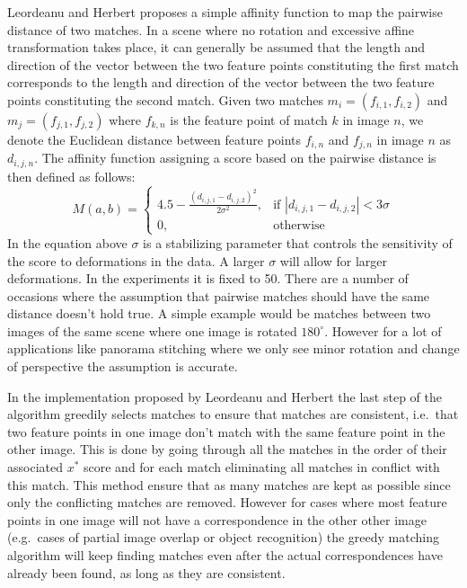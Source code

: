 Leordeanu and Herbert proposes a simple affinity function to map the 
pairwise distance of two matches. In a scene where no rotation and 
excessive affine transformation takes place, it can generally be assumed 
that the length and direction of the vector between
the two feature points constituting the first match corresponds to the 
length and direction of the vector between the two feature points 
constituting the second match. Given two matches $m_i = (f_{i,1}, 
f_{i,2})$ and $m_j = (f_{j,1},f_{j,2})$ where $f_{k,n}$ is the feature 
point of match $k$ in image $n$, we denote the Euclidean distance 
between feature points $f_{i,n}$ and $f_{j,n}$ in image $n$ as 
$d_{i,j,n}$.  The affinity function assigning a score based on the 
pairwise distance is then defined as follows:
\begin{equation*}
    M(a,b) = \begin{cases} 4.5 - \frac{\left(d_{i,j,1} - 
        d_{i,j,2}\right)^2}{2\sigma^2}, & \mbox{if } \left\vert 
                d_{i,j,1} - d_{i,j,2} \right\vert < 3\sigma \\ 0, & 
                \mbox{otherwise}
	\end{cases}
\end{equation*}
In the equation above $\sigma$ is a stabilizing parameter that controls 
the sensitivity of the score to deformations in the data. A larger 
$\sigma$ will allow for larger deformations. In the experiments it is 
fixed to 50. There are a number of occasions where the assumption that 
pairwise matches should have the same distance doesn't hold true.  A 
simple example would be matches between two images of the same scene 
where one image is rotated $180^{\circ}$.  However for a lot of 
applications like panorama stitching where we only see minor rotation 
and change of perspective the assumption is accurate.

In the implementation proposed by Leordeanu and Herbert 
\cite{leordeanu2005spectral} the last step of the algorithm greedily 
selects matches to ensure that matches are consistent, i.e.\ that two 
feature points in one image don't match with the same feature point in 
the other image. This is done by going through all the matches in the 
order of their associated $x^{*}$ score and for each match eliminating 
all matches in conflict with this match. This method ensure that as many
matches are kept as possible since only the conflicting matches are 
removed. However for cases where most feature points in one image will 
not have a correspondence in the other other image (e.g.\ cases of 
partial image overlap or object recognition) the greedy matching 
algorithm will keep finding matches even after the actual 
correspondences have already been found, as long as they are consistent.

